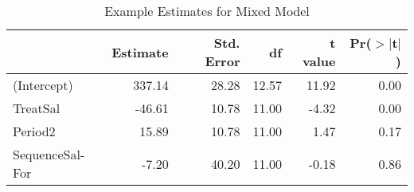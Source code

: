 \begin{table}[ht]
\centering
\begin{tabular}{l|rrrrr}
  \hline
 & Estimate & Std. Error & df & t value & Pr($>$$|$t$|$) \\ 
  \hline
(Intercept) & 337.14 & 28.28 & 12.57 & 11.92 & 0.00 \\ 
  TreatSal & -46.61 & 10.78 & 11.00 & -4.32 & 0.00 \\ 
  Period2 & 15.89 & 10.78 & 11.00 & 1.47 & 0.17 \\ 
  SequenceSal-For & -7.20 & 40.20 & 11.00 & -0.18 & 0.86 \\ 
   \hline
\end{tabular}
\caption{Example Estimates for Mixed Model} 
\label{modelTable}
\end{table}

